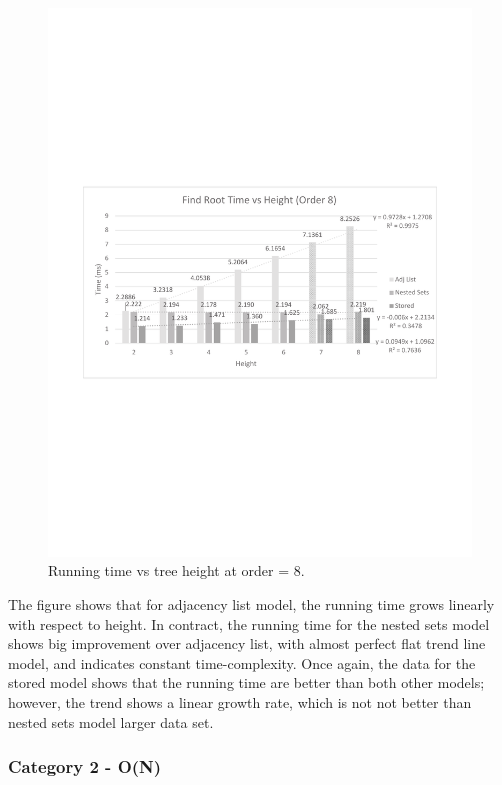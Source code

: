 \begin{figure}[h]
\begin{center}
\includegraphics[width=6in]{images/height.pdf}
\caption{Running time vs tree height at order = 8.\label{fig-time-height}}
\end{center}
\end{figure}

The figure shows that for adjacency list model, the running time grows linearly with respect to height. In contract, the running time for the nested sets model shows big improvement over adjacency list, with almost perfect flat trend line model, and indicates constant time-complexity. Once again, the data for the stored model shows that the running time are better than both other models; however, the trend shows a linear growth rate, which is not not better than nested sets model larger data set.


\subsubsection{Category 2 - O(N)}\label{eval_group2}

